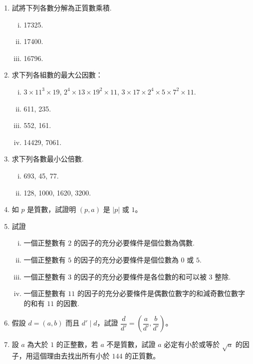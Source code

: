 \begin{enumerate}[1.]
  \item 試將下列各數分解為正質數乘積.
  \begin{enumerate}[(i)]
    \item 17325.
    \item 17400.
    \item 16796.
  \end{enumerate}

  \item 求下列各組數的最大公因數：
  \begin{enumerate}[(i)]
    \item $3 \times 11^3 \times 19$, $2^4 \times 13 \times 19^2 \times 11$, $3 \times 17 \times 2^4 \times 5 \times 7^2 \times 11$.
    \item 611, 235.
    \item 552, 161.
    \item 14429, 7061.
  \end{enumerate}

  \item 求下列各數最小公倍數.
  \begin{enumerate}[(i)]
    \item 693, 45, 77.
    \item 128, 1000, 1620, 3200.
  \end{enumerate}

  \item 如 $p$ 是質數，試證明 $(p, a)$ 是 $|p|$ 或 $1$。

  \item 試證
  \begin{enumerate}[(i)]
    \item 一個正整數有 $2$ 的因子的充分必要條件是個位數為偶數.
    \item 一個正整數有 $5$ 的因子的充分必要條件是個位數為 $0$ 或 $5$.
    \item 一個正整數有 $3$ 的因子的充分必要條件是各位數的和可以被 $3$ 整除.
    \item 一個正整數有 $11$ 的因子的充分必要條件是偶數位數字的和減奇數位數字的和有 $11$ 的因數.
  \end{enumerate}

  \item 假設 $d=(a, b)$ 而且 $d' \mid d$，試證 $\dfrac{d}{d'} = \left(\dfrac{a}{d'}, \dfrac{b}{d'}\right)$。

  \item 設 $a$ 為大於 $1$ 的正整數，若 $a$ 不是質數，試證 $a$ 必定有小於或等於 $\sqrt{a}$ 的因子，用這個理由去找出所有小於 $144$ 的正質數。


\end{enumerate}
